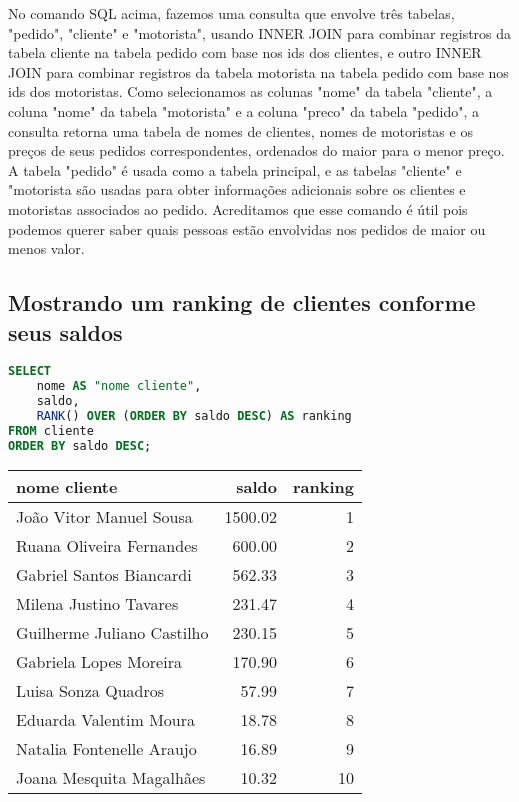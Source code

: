\documentclass{article}
\begin{document}
No comando SQL acima, fazemos uma consulta que envolve três tabelas, "pedido", "cliente" e "motorista", usando INNER JOIN para combinar registros da tabela cliente na tabela pedido com base nos ids dos clientes, e outro INNER JOIN para combinar registros da tabela motorista na tabela pedido com base nos ids dos motoristas. Como selecionamos as colunas "nome" da tabela "cliente", a coluna "nome" da tabela "motorista" e a coluna "preco" da tabela "pedido", a consulta retorna uma tabela de nomes de clientes, nomes de motoristas e os preços de seus pedidos correspondentes, ordenados do maior para o menor preço. A tabela "pedido" é usada como a tabela principal, e as tabelas "cliente" e "motorista são usadas para obter informações adicionais sobre os clientes e motoristas associados ao pedido. Acreditamos que esse comando é útil pois podemos querer saber quais pessoas estão envolvidas nos pedidos de maior ou menos valor.

\subsection{Mostrando um ranking de clientes conforme seus saldos}

\begin{lstlisting}[language=SQL]
SELECT
    nome AS "nome cliente",
    saldo,
    RANK() OVER (ORDER BY saldo DESC) AS ranking
FROM cliente
ORDER BY saldo DESC;
\end{lstlisting}


\begin{table}[h]
    \centering
    \begin{tabular}{l|r|r}
    
    \textbf{nome cliente } & \textbf{saldo} & \textbf{ranking} \\
    \hline

    João Vitor Manuel Sousa     &   1500.02     &        1  \\
    Ruana Oliveira Fernandes    &    600.00     &        2  \\
    Gabriel Santos Biancardi    &    562.33     &        3  \\
    Milena Justino Tavares      &    231.47     &        4  \\
    Guilherme Juliano Castilho  &    230.15     &        5  \\
    Gabriela Lopes Moreira      &    170.90     &        6  \\
    Luisa Sonza Quadros         &     57.99     &        7  \\
    Eduarda Valentim Moura      &     18.78     &        8  \\
    Natalia Fontenelle Araujo   &     16.89     &        9  \\
    Joana Mesquita Magalhães    &     10.32     &       10
    
\end{tabular}
\end{table}
\end{document}
